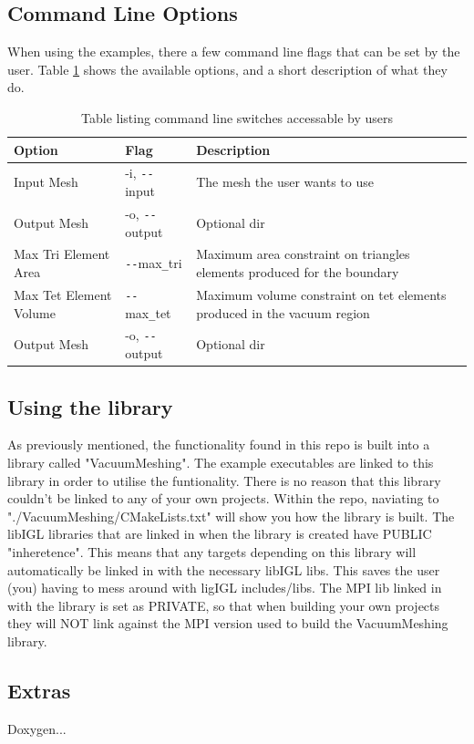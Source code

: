 \documentclass[12pt, letterpaper]{article}
\begin{document}
\subsection{Command Line Options} \label{CLFlags}
When using the examples, there a few command line flags that can be set by the user. Table \ref{CLFlagsTab} shows the available options, and a short description of what they do. 

\begin{table}[ht]
\begin{center}
\begin{tabularx}{0.9\textwidth}{
  | >{\raggedright\arraybackslash}X 
  | >{\raggedright\arraybackslash}X 
  | >{\raggedright\arraybackslash}X | }
  \hline
  \textbf{Option} & \textbf{Flag} & \textbf{Description} \\
  \hline
  \hline
  Input Mesh & -i, \texttt{-{}-}input & The mesh the user wants to use\\
  \hline
  Output Mesh & -o, \texttt{-{}-}output & Optional dir\\
  \hline 
  Max Tri Element Area & \texttt{-{}-}max\texttt{\_}tri & Maximum area constraint on triangles elements produced for the boundary\\
  \hline 
  Max Tet Element Volume & \texttt{-{}-}max\texttt{\_}tet & Maximum volume constraint on tet elements produced in the vacuum region\\
  \hline 
  Output Mesh & -o, \texttt{-{}-}output & Optional dir\\
  \hline
\end{tabularx}
\caption{Table listing command line switches accessable by users}
\label{CLFlagsTab}
\end{center}
\end{table}


\subsection{Using the library}
As previously mentioned, the functionality found in this repo is built into a library called "VacuumMeshing". The example executables are linked to this library in order to utilise the funtionality. There is no reason that this library couldn't be linked to any of your own projects. Within the repo, naviating to "./VacuumMeshing/CMakeLists.txt" will show you how the library is built. The libIGL libraries that are linked in when the library is created have PUBLIC "inheretence". This means that any targets depending on this library will automatically be linked in with the necessary libIGL libs. This saves the user (you) having to mess around with ligIGL includes/libs. The MPI lib linked in with the library is set as PRIVATE, so that when building your own projects they will NOT link against the MPI version used to build the VacuumMeshing library.

\subsection{Extras}
Doxygen...
\end{document}
